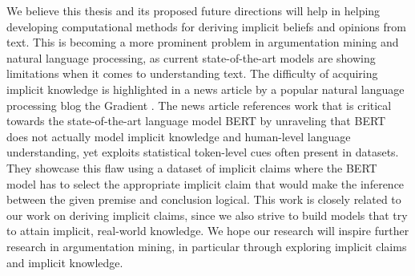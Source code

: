 We believe this thesis and its proposed future directions will help in helping
developing computational methods for deriving implicit beliefs and opinions
from text.  This is becoming a more prominent problem in argumentation mining
and natural language processing, as current state-of-the-art models are showing
limitations when it comes to understanding text. 
The difficulty of acquiring implicit knowledge is highlighted
in a news article by a popular natural language processing blog the Gradient
\citep{gradientpub}.  The news article references work that is 
critical towards the state-of-the-art language
model BERT \citep{devlin2018bert} by unraveling that BERT
does not actually model implicit knowledge and human-level language
understanding, yet exploits statistical token-level cues often present in
datasets. They showcase this flaw using a dataset of implicit claims where the
BERT model has to select the appropriate implicit claim that would make the
inference between the given premise and conclusion logical. This work
is closely related to our work on deriving implicit claims, since we also strive to 
build models that try to attain implicit, real-world knowledge. 
We hope our research will inspire further research in argumentation
mining, in particular through exploring implicit claims and implicit knowledge. 

